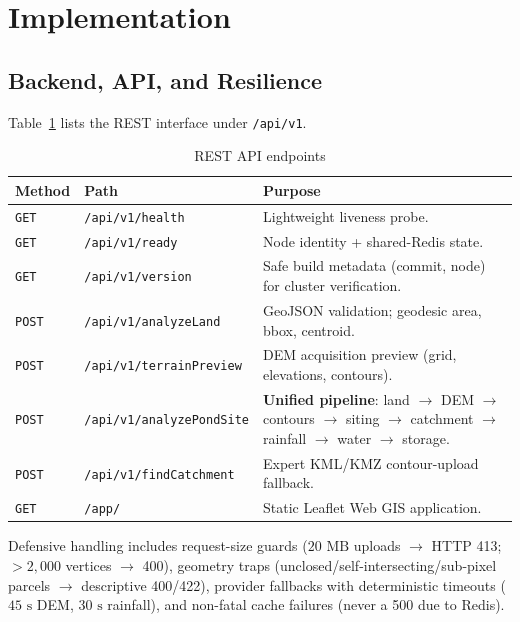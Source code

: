 \documentclass[manuscript,screen,review]{acmart}
\begin{document}
\section{Implementation}
\label{sec:implementation}

\subsection{Backend, API, and Resilience}
Table~\ref{tab:endpoints} lists the REST interface under \texttt{/api/v1}.

\begin{table}[h]
  \caption{REST API endpoints}
  \label{tab:endpoints}
  \begin{tabular}{llp{8.2cm}}
    \toprule
    Method & Path & Purpose \\
    \midrule
    \texttt{GET} & \texttt{/api/v1/health} & Lightweight liveness probe. \\
    \texttt{GET} & \texttt{/api/v1/ready} & Node identity + shared-Redis state. \\
    \texttt{GET} & \texttt{/api/v1/version} & Safe build metadata (commit, node) for cluster verification. \\
    \texttt{POST} & \texttt{/api/v1/analyzeLand} & GeoJSON validation; geodesic area, bbox, centroid. \\
    \texttt{POST} & \texttt{/api/v1/terrainPreview} & DEM acquisition preview (grid, elevations, contours). \\
    \texttt{POST} & \texttt{/api/v1/analyzePondSite} & \textbf{Unified pipeline}: land $\to$ DEM $\to$ contours $\to$ siting $\to$ catchment $\to$ rainfall $\to$ water $\to$ storage. \\
    \texttt{POST} & \texttt{/api/v1/findCatchment} & Expert KML/KMZ contour-upload fallback. \\
    \texttt{GET} & \texttt{/app/} & Static Leaflet Web GIS application. \\
    \bottomrule
  \end{tabular}
\end{table}

Defensive handling includes request-size guards ($20\text{ MB}$ uploads $\to$ HTTP 413; $>2{,}000$ vertices $\to$ 400), geometry traps (unclosed/self-intersecting/sub-pixel parcels $\to$ descriptive 400/422), provider fallbacks with deterministic timeouts ($45\text{ s}$ DEM, $30\text{ s}$ rainfall), and non-fatal cache failures (never a 500 due to Redis).
\end{document}
